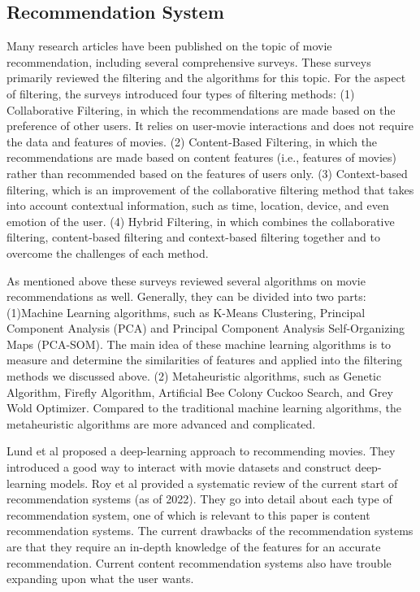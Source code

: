 \documentclass[journal]{IEEEtran}
\begin{document}
\subsection{Recommendation System}
Many research articles have been published on the topic of movie recommendation, including several comprehensive surveys\cite{RN19}. These surveys primarily reviewed the filtering and the algorithms for this topic. For the aspect of filtering, the surveys introduced four types of filtering methods: (1) Collaborative Filtering, in which the recommendations are made based on the preference of other users. It relies on user-movie interactions and does not require the data and features of movies. (2) Content-Based Filtering, in which the recommendations are made based on content features (i.e., features of movies) rather than recommended based on the features of users only. (3) Context-based filtering, which is an improvement of the collaborative filtering method that takes into account contextual information, such as time, location, device, and even emotion of the user. (4) Hybrid Filtering, in which combines the collaborative filtering, content-based filtering and context-based filtering together and to overcome the challenges of each method.

As mentioned above these surveys reviewed several algorithms on movie recommendations as well. Generally, they can be divided into two parts: (1)Machine Learning algorithms, such as K-Means Clustering, Principal Component Analysis (PCA) and Principal Component Analysis Self-Organizing Maps (PCA-SOM). The main idea of these machine learning algorithms is to measure and determine the similarities of features and applied into the filtering methods we discussed above. (2) Metaheuristic algorithms, such as Genetic Algorithm, Firefly Algorithm, Artificial Bee Colony Cuckoo Search, and Grey Wold Optimizer. Compared to the traditional machine learning algorithms, the metaheuristic algorithms are more advanced and complicated.

Lund et al\cite{RN7} proposed a deep-learning approach to recommending movies. They introduced a good way to interact with movie datasets and construct deep-learning models.
Roy et al\cite{RN17} provided a systematic review of the current start of recommendation systems (as of 2022). They go into detail about each type of recommendation system, one of which is relevant to this paper is content recommendation systems. The current drawbacks of the recommendation systems are that they require an in-depth knowledge of the features for an accurate recommendation. Current content recommendation systems also have trouble expanding upon what the user wants.
\end{document}

